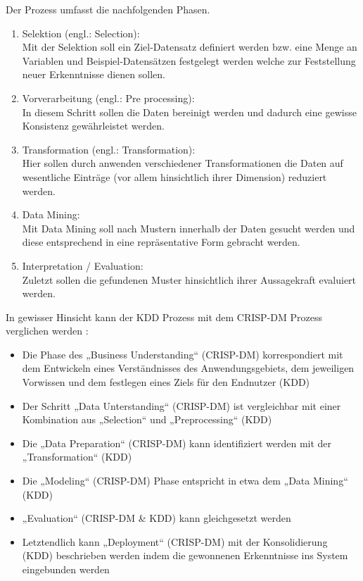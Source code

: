 Der Prozess umfasst die nachfolgenden Phasen.
\begin{enumerate}
  \item Selektion (engl.: Selection): \\
  Mit der Selektion soll ein Ziel-Datensatz definiert werden bzw. eine Menge an
  Variablen und Beispiel-Datensätzen festgelegt werden welche zur Feststellung
  neuer Erkenntnisse dienen sollen.
  \item Vorverarbeitung (engl.: Pre processing): \\
  In diesem Schritt sollen die Daten bereinigt werden und dadurch eine gewisse
  Konsistenz gewährleistet werden.
  \item Transformation (engl.: Transformation):  \\
  Hier sollen durch anwenden verschiedener Transformationen die Daten auf
  wesentliche Einträge (vor allem hinsichtlich ihrer Dimension) reduziert werden.
  \item Data Mining:  \\
  Mit Data Mining soll nach Mustern innerhalb der Daten gesucht werden und diese
  entsprechend in eine repräsentative Form gebracht werden.
  \item Interpretation / Evaluation:  \\
  Zuletzt sollen die gefundenen Muster hinsichtlich ihrer Aussagekraft evaluiert werden.
\end{enumerate}

In gewisser Hinsicht kann der KDD Prozess mit dem CRISP-DM Prozess verglichen
werden \cite{IPP}:
\begin{itemize}
  \item Die Phase des „Business Understanding“ (CRISP-DM) korrespondiert mit dem
  Entwickeln eines Verständnisses des Anwendungsgebiets, dem jeweiligen
  Vorwissen und dem festlegen eines Ziels für den Endnutzer (KDD)
  \item Der Schritt „Data Unterstanding“ (CRISP-DM) ist vergleichbar mit einer
  Kombination aus „Selection“ und „Preprocessing“ (KDD)
  \item Die „Data Preparation“ (CRISP-DM) kann identifiziert werden mit der
  „Transformation“ (KDD)
  \item Die „Modeling“ (CRISP-DM) Phase entspricht in etwa dem „Data Mining“ (KDD)
  \item „Evaluation“ (CRISP-DM & KDD) kann gleichgesetzt werden
  \item Letztendlich kann „Deployment“ (CRISP-DM) mit der Konsolidierung (KDD)
  beschrieben werden indem die gewonnenen Erkenntnisse ins System eingebunden
  werden
\end{itemize}

